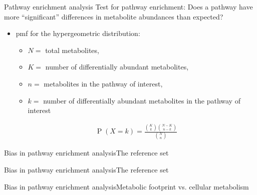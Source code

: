 \documentclass[xcolor=dvipsnames]{beamer}
\DeclareMathOperator{\PP}{P}
\begin{document}
\begin{frame}{Pathway enrichment analysis}
	\vspace{-10pt}
{\Large Test for pathway enrichment: Does a pathway have more ``significant'' differences in metabolite abundances than expected?} \vspace{10pt}

	\begin{itemize}
		\item pmf for the hypergeometric distribution: 
		\begin{itemize}
			\item $N=$ total metabolites,
			\item $K=$ number of differentially abundant metabolites, 
			\item $n=$ metabolites in the pathway of interest, 
			\item $k=$ number of differentially abundant metabolites in the pathway of interest 
		\end{itemize}
		\begin{align*}
		\PP(X=k) = \frac{  {{K}\choose{k}} {{N-K}\choose{n-k}}  }{ {{N}\choose{n}} } 
		\end{align*}
	\end{itemize}
\end{frame}

\begin{frame}{Bias in pathway enrichment analysis}{The reference set}
	\vspace{-15.5pt}
	\begin{figure}
	\end{figure}
\end{frame}

\begin{frame}{Bias in pathway enrichment analysis}{The reference set}
	\vspace{-15.5pt}
	\begin{figure}
	\end{figure}
\end{frame}

\begin{frame}{Bias in pathway enrichment analysis}{Metabolic footprint vs. cellular metabolism}	\vspace{-10.5pt}
	\begin{center}
	\end{center}
\end{frame}
\end{document}
